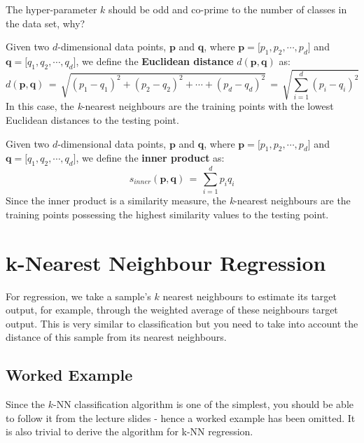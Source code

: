 \documentclass[11pt,fleqn]{book} %
\begin{document}
\begin{exercise}
The hyper-parameter $k$ should be odd and co-prime to the number of classes in the data set, why?
\end{exercise}

\begin{definition}
Given two $d$-dimensional data points, $\mathbf{p}$ and $\mathbf{q}$, where $\mathbf{p}= \big[p_1, p_2, \cdots, p_d\big]$ and $\mathbf{q} = \big[q_1, q_2, \cdots, q_d\big]$, we define the \textbf{Euclidean distance} $d(\mathbf{p},\mathbf{q})$ as:
\begin{equation*}
	d(\mathbf{p},\mathbf{q}) \, = \, \sqrt{(p_1 - q_1)^2 + (p_2 - q_2)^2 + \cdots + (p_d - q_d)^2} \, = \, \sqrt{\sum^d_{i=1}(p_i - q_i)^2}
\end{equation*}
In this case, the \textit{k}-nearest neighbours are the training points with the lowest Euclidean distances to the testing point.
\end{definition}

\begin{definition}
Given two $d$-dimensional data points, $\mathbf{p}$ and $\mathbf{q}$, where $\mathbf{p}= \big[p_1, p_2, \cdots, p_d\big]$ and $\mathbf{q} = \big[q_1, q_2, \cdots, q_d\big]$, we define the \textbf{inner product} as:
\begin{equation*}
	s_{inner}(\mathbf{p},\mathbf{q}) \, = \, \sum^d_{i=1}p_iq_i
\end{equation*}
Since the inner product is a similarity measure, the \textit{k}-nearest neighbours are the training points possessing the highest similarity values to the testing point.
\end{definition}

\section{k-Nearest Neighbour Regression}
For regression, we take a sample's $k$ nearest neighbours to estimate its target output, for example, through the weighted average of these neighbours target output. This is very similar to classification but you need to take into account the distance of this sample from its nearest neighbours.

\subsection*{Worked Example}
Since the $k$-NN classification algorithm is one of the simplest, you should be able to follow it from the lecture slides - hence a worked example has been omitted. It is also trivial to derive the algorithm for k-NN regression.
\end{document}
